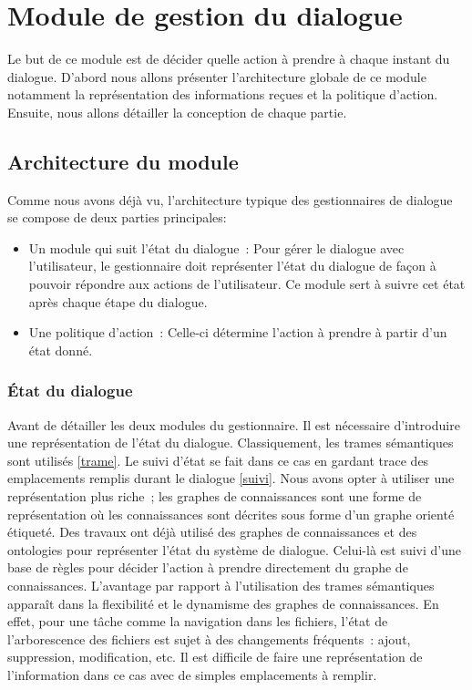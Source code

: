 \section{Module de gestion du dialogue}
Le but de ce module est de décider quelle action à prendre à chaque instant du dialogue. D’abord nous allons présenter l’architecture globale de ce module notamment la représentation des informations reçues et la politique d’action. Ensuite, nous allons détailler la conception de chaque partie.
\subsection{Architecture du module}
Comme nous avons déjà vu, l’architecture typique des gestionnaires de dialogue se compose de deux parties principales: 
\begin{itemize}
	\item Un module qui suit l’état du dialogue : Pour gérer le dialogue avec l’utilisateur, le gestionnaire doit représenter l’état du dialogue de façon à pouvoir répondre aux actions de l’utilisateur. Ce module sert à suivre cet état après chaque étape du dialogue.
	\item Une politique d’action : Celle-ci détermine l’action à prendre à partir d’un état donné.
\end{itemize}
\subsubsection{État du dialogue}
Avant de détailler les deux modules du gestionnaire. Il est nécessaire d’introduire une représentation de l’état du dialogue. Classiquement, les trames sémantiques sont utilisés \ref{trame}. Le suivi d’état se fait dans ce cas en gardant trace des emplacements remplis durant le dialogue \ref{suivi}.
Nous avons opter à utiliser une représentation plus riche ; les graphes de connaissances sont une forme de représentation où les connaissances sont décrites sous forme d’un graphe orienté étiqueté. Des travaux ont déjà utilisé des graphes de connaissances\cite{Stoyanchev2018} et des ontologies\cite{Wessel2019} pour représenter l’état du système de dialogue. Celui-là est suivi d’une base de règles pour décider l’action à prendre directement du graphe de connaissances. L’avantage par rapport à l’utilisation des trames sémantiques apparaît dans la flexibilité et le dynamisme des graphes de connaissances. En effet, pour une tâche comme la navigation dans les fichiers, l’état de l’arborescence des fichiers est sujet à des changements fréquents : ajout, suppression, modification, etc. Il est difficile de faire une représentation de l’information dans ce cas avec de simples emplacements à remplir.
